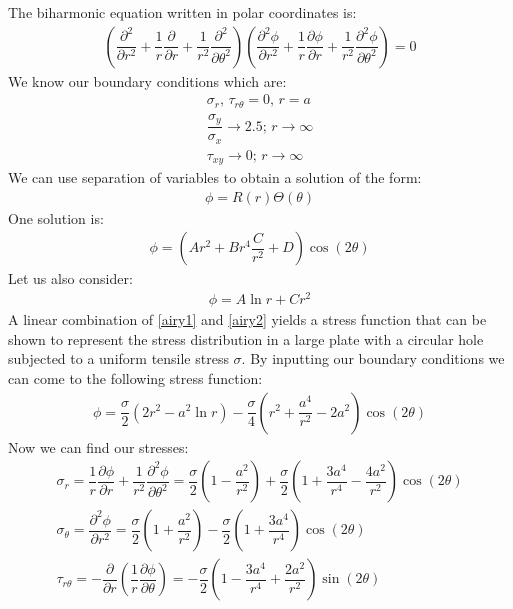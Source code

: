 \documentclass[11pt]{article}
\numberwithin{equation}{section}
\begin{document}
The biharmonic equation written in polar coordinates is:
\begin{gather}
    \left(\dfrac{\partial^2}{\partial r^2} + \dfrac{1}{r}\dfrac{\partial}{\partial r}+\dfrac{1}{r^2}\dfrac{\partial^2}{\partial \theta^2}\right)\left(\dfrac{\partial^2\phi}{\partial r^2}+\dfrac{1}{r}\dfrac{\partial\phi}{\partial r}+\dfrac{1}{r^2}\dfrac{\partial^2 \phi}{\partial\theta^2}\right) = 0
\end{gather}
We know our boundary conditions which are:
\begin{gather}
    \sigma_r, \, \tau_{r\theta} = 0, \, r = a\\
    \dfrac{\sigma_y}{\sigma_x} \rightarrow 2.5; \, r \rightarrow \infty\\
    \tau_{xy} \rightarrow 0; \, r \rightarrow \infty
\end{gather}
We can use separation of variables to obtain a solution of the form:
\begin{gather}
    \phi = R(r)\Theta (\theta)
\end{gather}
One solution is:
\begin{gather}
    \phi = \left(Ar^2 + Br^4 \dfrac{C}{r^2} + D\right)\cos \left(2\theta\right)\label{airy1}
\end{gather}
Let us also consider:
\begin{align}
    \phi = A \ln r + Cr^2 \label{airy2}
\end{align}
A linear combination of \ref{airy1} and \ref{airy2} yields a stress function that can be shown to represent the stress distribution in a large plate with a circular hole subjected to a uniform tensile stress $\sigma$. By inputting our boundary conditions we can come to the following stress function:
\begin{gather}
    \phi = \dfrac{\sigma}{2}\left(2r^2 - a^2 \ln r\right) - \dfrac{\sigma}{4}\left(r^2+\dfrac{a^4}{r^2}-2a^2\right)\cos \left(2\theta\right)
\end{gather}
Now we can find our stresses:
\begin{gather}
    \sigma_r = \dfrac{1}{r}\dfrac{\partial \phi}{\partial r} + \dfrac{1}{r^2}\dfrac{\partial^2\phi}{\partial \theta^2} = \dfrac{\sigma}{2}\left(1 - \dfrac{a^2}{r^2}\right) + \dfrac{\sigma}{2}\left(1+\dfrac{3a^4}{r^4}-\dfrac{4a^2}{r^2}\right)\cos\left(2\theta\right)\\
    \sigma_{\theta} = \dfrac{\partial^2\phi}{\partial r^2} = \dfrac{\sigma}{2}\left(1 + \dfrac{a^2}{r^2}\right) - \dfrac{\sigma}{2}\left(1 + \dfrac{3a^4}{r^4}\right)\cos \left(2\theta\right)\\
    \tau_{r\theta} = -\dfrac{\partial}{\partial r}\left(\dfrac{1}{r}\dfrac{\partial \phi}{\partial \theta}\right) = -\dfrac{\sigma}{2}\left(1 - \dfrac{3a^4}{r^4}+\dfrac{2a^2}{r^2}\right)\sin\left(2\theta\right)
\end{gather}
\end{document}
